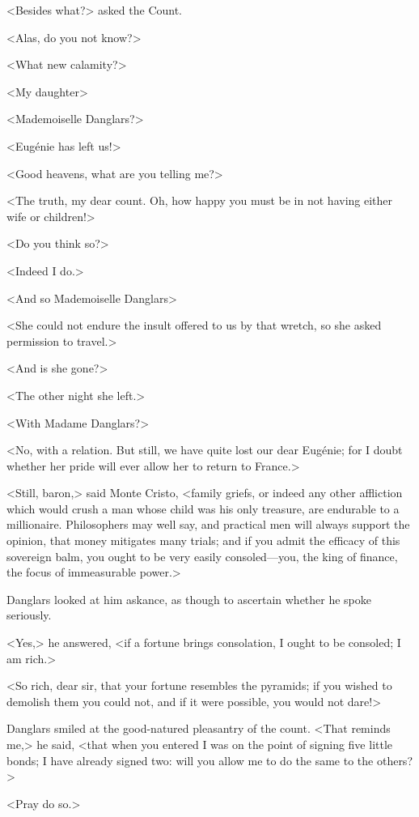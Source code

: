  <Besides what?> asked the Count. 

 <Alas, do you not know?> 

 <What new calamity?> 

 <My daughter\longdash> 

 <Mademoiselle Danglars?> 

 <Eugénie has left us!> 

 <Good heavens, what are you telling me?> 

 <The truth, my dear count. Oh, how happy you must be in not having either wife or children!> 

 <Do you think so?> 

 <Indeed I do.> 

 <And so Mademoiselle Danglars\longdash> 

 <She could not endure the insult offered to us by that wretch, so she asked permission to travel.> 

 <And is she gone?> 

 <The other night she left.> 

 <With Madame Danglars?> 

 <No, with a relation. But still, we have quite lost our dear Eugénie; for I doubt whether her pride will ever allow her to return to France.> 

 <Still, baron,> said Monte Cristo, <family griefs, or indeed any other affliction which would crush a man whose child was his only treasure, are endurable to a millionaire. Philosophers may well say, and practical men will always support the opinion, that money mitigates many trials; and if you admit the efficacy of this sovereign balm, you ought to be very easily consoled—you, the king of finance, the focus of immeasurable power.> 

 Danglars looked at him askance, as though to ascertain whether he spoke seriously. 

 <Yes,> he answered, <if a fortune brings consolation, I ought to be consoled; I am rich.> 

 <So rich, dear sir, that your fortune resembles the pyramids; if you wished to demolish them you could not, and if it were possible, you would not dare!> 

 Danglars smiled at the good-natured pleasantry of the count. <That reminds me,> he said, <that when you entered I was on the point of signing five little bonds; I have already signed two: will you allow me to do the same to the others?> 

 <Pray do so.> 

